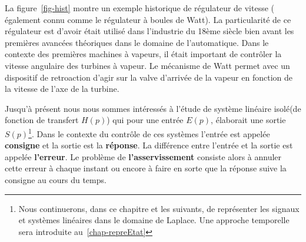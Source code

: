 La figure~\ref{fig-hist} montre un exemple historique de régulateur de 
vitesse ( également connu comme le régulateur à boules de Watt). 
La particularité de ce régulateur est d'avoir était utilisé dans l'industrie
du 18ème siècle bien avant les premières avancées théoriques dans le domaine 
de l'automatique. Dans le contexte des premières machines à vapeurs, 
il était important de contrôler la vitesse angulaire des turbines à vapeur. 
Le mécanisme de Watt permet avec un dispositif de retroaction d'agir sur la 
valve d'arrivée de la vapeur en fonction de la vitesse de l'axe de la turbine.

Jusqu'à présent nous nous sommes intéressés à l'étude de système 
linéaire \og isolé\fg (de fonction de transfert $H(p)$) 
qui pour une entrée $E(p)$, élaborait une sortie $S(p)$\footnote{Nous
continuerons, dans ce chapitre et les suivants, de représenter 
les signaux et systèmes linéaires dans le domaine de Laplace. Une approche 
temporelle sera introduite au~\cref{chap-repreEtat}}. Dans le contexte du 
contrôle de ces systèmes l'entrée est appelée \textbf{consigne} et la sortie
est la \textbf{réponse}. La différence entre l'entrée et la sortie est 
appelée \textbf{l'erreur}. Le problème de \textbf{l'asservissement} consiste 
alors à annuler cette erreur à chaque instant ou encore à faire en sorte que 
la réponse suive la consigne au cours du temps.

